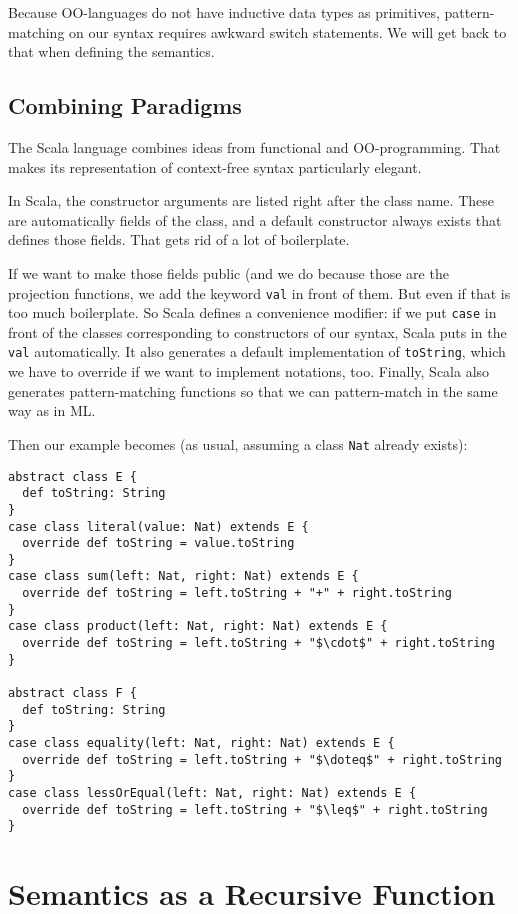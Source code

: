 Because OO-languages do not have inductive data types as primitives, pattern-matching on our syntax requires awkward switch statements.
We will get back to that when defining the semantics.

\subsection{Combining Paradigms}

The Scala language combines ideas from functional and OO-programming.
That makes its representation of context-free syntax particularly elegant.

In Scala, the constructor arguments are listed right after the class name.
These are automatically fields of the class, and a default constructor always exists that defines those fields.
That gets rid of a lot of boilerplate.

If we want to make those fields public (and we do because those are the projection functions, we add the keyword \texttt{val} in front of them.
But even if that is too much boilerplate. So Scala defines a convenience modifier: if we put \texttt{case} in front of the classes corresponding to constructors of our syntax, Scala puts in the \texttt{val} automatically.
It also generates a default implementation of \texttt{toString}, which we have to override if we want to implement notations, too.
Finally, Scala also generates pattern-matching functions so that we can pattern-match in the same way as in ML.

Then our example becomes (as usual, assuming a class \texttt{Nat} already exists):

\begin{lstlisting}
abstract class E {
  def toString: String
}
case class literal(value: Nat) extends E {
  override def toString = value.toString
}
case class sum(left: Nat, right: Nat) extends E {
  override def toString = left.toString + "+" + right.toString
}
case class product(left: Nat, right: Nat) extends E {
  override def toString = left.toString + "$\cdot$" + right.toString
}

abstract class F {
  def toString: String
}
case class equality(left: Nat, right: Nat) extends E {
  override def toString = left.toString + "$\doteq$" + right.toString
}
case class lessOrEqual(left: Nat, right: Nat) extends E {
  override def toString = left.toString + "$\leq$" + right.toString
}
\end{lstlisting}

\section{Semantics as a Recursive Function}

